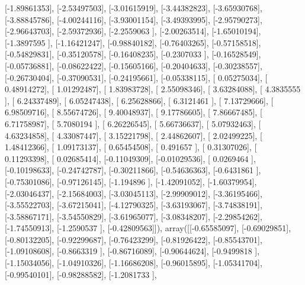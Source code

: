 \documentclass{article}
\begin{document}
       [-1.89861353],
       [-2.53497503],
       [-3.01615919],
       [-3.44382823],
       [-3.65930768],
       [-3.88845786],
       [-4.00244116],
       [-3.93001154],
       [-3.49393995],
       [-2.95790273],
       [-2.96643703],
       [-2.59372936],
       [-2.2559063 ],
       [-2.00263514],
       [-1.65010194],
       [-1.3897595 ],
       [-1.16421247],
       [-0.98840182],
       [-0.76403265],
       [-0.57158518],
       [-0.54829831],
       [-0.35120578],
       [-0.16408235],
       [-0.2307033 ],
       [-0.16528549],
       [-0.05736881],
       [-0.08622422],
       [-0.15605166],
       [-0.20404633],
       [-0.30238557],
       [-0.26730404],
       [-0.37090531],
       [-0.24195661],
       [-0.05338115],
       [ 0.05275034],
       [ 0.48914272],
       [ 1.01292487],
       [ 1.83983728],
       [ 2.55098346],
       [ 3.63284088],
       [ 4.3835555 ],
       [ 6.24337489],
       [ 6.05247438],
       [ 6.25628866],
       [ 6.3121461 ],
       [ 7.13729666],
       [ 6.98509716],
       [ 8.55674726],
       [ 9.40048937],
       [ 9.17786605],
       [ 7.86667485],
       [ 6.71758987],
       [ 5.7080194 ],
       [ 6.26226545],
       [ 5.66736637],
       [ 5.07932463],
       [ 4.63234858],
       [ 4.33087447],
       [ 3.15221798],
       [ 2.44862607],
       [ 2.02499225],
       [ 1.48412366],
       [ 1.09173137],
       [ 0.65454508],
       [ 0.491657  ],
       [ 0.31307026],
       [ 0.11293398],
       [ 0.02685414],
       [-0.11049309],
       [-0.01029536],
       [ 0.0269464 ],
       [-0.10198633],
       [-0.24742787],
       [-0.30211866],
       [-0.54636363],
       [-0.6431861 ],
       [-0.75301086],
       [-0.97126145],
       [-1.194896  ],
       [-1.42091052],
       [-1.60379954],
       [-2.03046437],
       [-2.15684003],
       [-3.03045113],
       [-2.99909012],
       [-3.36195466],
       [-3.55522703],
       [-3.67215041],
       [-4.12790325],
       [-3.63193067],
       [-3.74838191],
       [-3.58867171],
       [-3.54550829],
       [-3.61965077],
       [-3.08348207],
       [-2.29854262],
       [-1.74550913],
       [-1.2590537 ],
       [-0.42809563]]), array([[-0.65585097],
       [-0.69029851],
       [-0.80132205],
       [-0.92299687],
       [-0.76423299],
       [-0.81926422],
       [-0.85543701],
       [-1.09108608],
       [-0.8663319 ],
       [-0.86716089],
       [-0.90644624],
       [-0.9499818 ],
       [-1.15034056],
       [-1.04910326],
       [-1.16686208],
       [-0.96015895],
       [-1.05341704],
       [-0.99540101],
       [-0.98288582],
       [-1.2081733 ],
\end{document}
